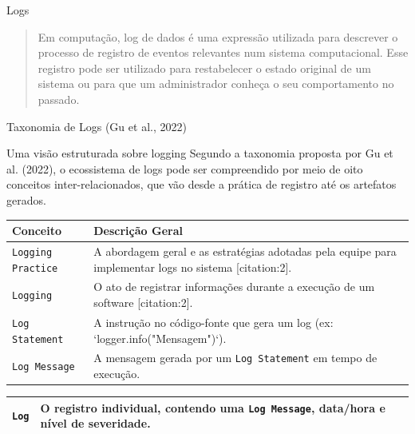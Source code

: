 \documentclass{if-beamer}
\begin{document}
	\begin{frame}{Logs}
\begin{quote}
Em computação, log de dados é uma expressão utilizada para descrever o processo de registro de eventos relevantes num sistema computacional. Esse registro pode ser utilizado para restabelecer o estado original de um sistema ou para que um administrador conheça o seu comportamento no passado.
\end{quote}
\end{frame}

\begin{frame}[allowframebreaks]{Taxonomia de Logs (Gu et al., 2022)}
    \begin{block}{Uma visão estruturada sobre logging}
        Segundo a taxonomia proposta por Gu et al. (2022), o ecossistema de logs pode ser compreendido por meio de oito conceitos inter-relacionados, que vão desde a prática de registro até os artefatos gerados.
    \end{block}
\framebreak    
    \begin{table}
        \centering
        \small
        \begin{tabular}{|p{2.8cm}|p{8.5cm}|}
            \hline
            \textbf{Conceito} & \textbf{Descrição Geral} \\
            \hline
            \texttt{Logging Practice} & A abordagem geral e as estratégias adotadas pela equipe para implementar logs no sistema [citation:2]. \\
            \hline
            \texttt{Logging} & O ato de registrar informações durante a execução de um software [citation:2]. \\
            \hline
            \texttt{Log Statement} & A instrução no código-fonte que gera um log (ex: `logger.info("Mensagem")`). \\
            \hline
            \texttt{Log Message} & A mensagem gerada por um \texttt{Log Statement} em tempo de execução. \\
            \hline
        \end{tabular}
    \end{table}
    \framebreak
            \begin{table}
        \centering
        \small
        \begin{tabular}{|p{2.8cm}|p{8.5cm}|}            
            \hline
            \texttt{Log} & O registro individual, contendo uma \texttt{Log Message}, data/hora e nível de severidade. \\
            \hline

\end{tabular}
\end{table}
\end{frame}
\end{document}
